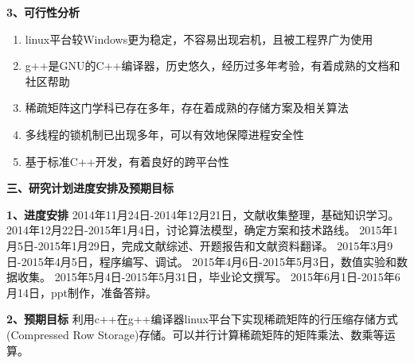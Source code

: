 \documentclass{article}
\begin{document}
     \textbf{3、可行性分析}
     \begin{enumerate}[1]
\item 	linux平台较Windows更为稳定，不容易出现宕机，且被工程界广为使用
\item 	g++是GNU的C++编译器，历史悠久，经历过多年考验，有着成熟的文档和社区帮助
\item		稀疏矩阵这门学科已存在多年，存在着成熟的存储方案及相关算法
\item		多线程的锁机制已出现多年，可以有效地保障进程安全性
\item		基于标准C++开发，有着良好的跨平台性

\end{enumerate}


\textbf{三、研究计划进度安排及预期目标}
      \qquad
\newline
 

     \textbf{1、进度安排}\qquad \newline
     2014年11月24日-2014年12月21日，文献收集整理，基础知识学习。\newline
2014年12月22日-2015年1月4日，讨论算法模型，确定方案和技术路线。\newline
2015年1月5日-2015年1月29日，完成文献综述、开题报告和文献资料翻译。\newline
2015年3月9日-2015年4月5日，程序编写、调试。\newline
2015年4月6日-2015年5月3日，数值实验和数据收集。\newline
2015年5月4日-2015年5月31日，毕业论文撰写。\newline
2015年6月1日-2015年6月14日，ppt制作，准备答辩。
\newline



     \textbf{2、预期目标}
     利用c++在g++编译器linux平台下实现稀疏矩阵的行压缩存储方式(Compressed Row Storage)存储。可以并行计算稀疏矩阵的矩阵乘法、数乘等运算。
\newline
 
\end{document}
